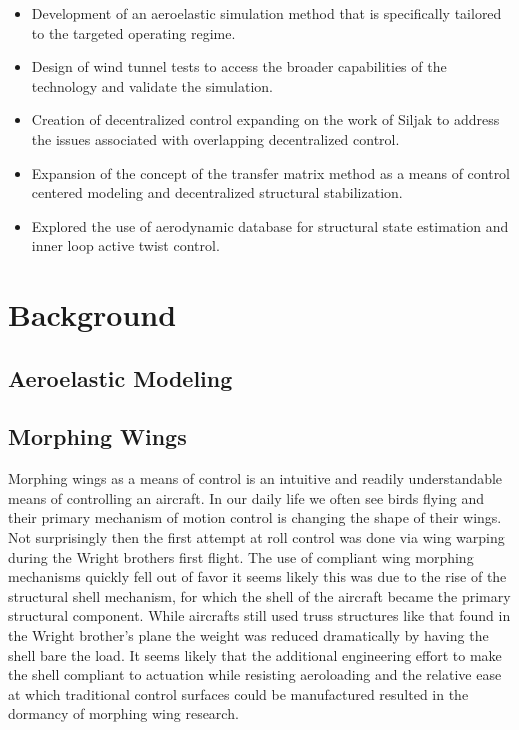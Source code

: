 \documentclass[11pt]{ucthesis}
\begin{document}
\begin{itemize}
\item Development of an aeroelastic simulation method that is specifically tailored to the targeted operating regime. 
\item Design of wind tunnel tests to access the broader capabilities of the technology and validate the simulation.
\item Creation of decentralized control expanding on the work of Siljak \cite{siljak2011decentralized} to address the issues associated with overlapping decentralized control.
\item Expansion of the concept of the transfer matrix method as a means of control centered modeling and decentralized structural stabilization.
\item Explored the use of aerodynamic database for structural state estimation and inner loop active twist control.
\end{itemize}

\chapter{Background}
\section{Aeroelastic Modeling}

\section{Morphing Wings}
Morphing wings as a means of control is an intuitive and readily understandable means of controlling an aircraft. In our daily life we often see birds flying and their primary mechanism of motion control is changing the shape of their wings. Not surprisingly then the first attempt at roll control was done via wing warping during the Wright brothers first flight. \cite{friswell2009prospects} The use of compliant wing morphing mechanisms quickly fell out of favor it seems likely this was due to the rise of the structural shell mechanism, for which the shell of the aircraft became the primary structural component. While aircrafts still used truss structures like that found in the Wright brother's plane the weight was reduced dramatically by having the shell bare the load. \cite{weisshaar2011aerospace} It seems likely that the additional engineering effort to make the shell compliant to actuation while resisting aeroloading and the relative ease at which traditional control surfaces could be manufactured resulted in the dormancy of morphing wing research.
\end{document}
